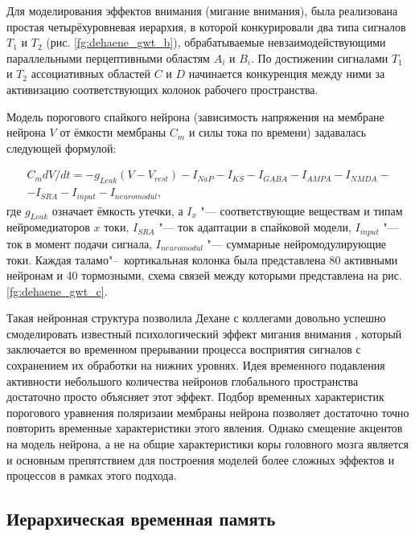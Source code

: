 Для моделирования эффектов внимания (мигание внимания), была реализована простая четырёхуровневая иерархия, в которой конкурировали два типа сигналов $T_1$ и $T_2$ (рис. \ref{fg:dehaene_gwt_b}), обрабатываемые невзаимодействующими параллельными перцептивными областям $A_i$ и $B_i$. По достижении сигналами $T_1$ и $T_2$ ассоциативных областей $C$ и $D$ начинается конкуренция между ними за активизацию соответствующих колонок рабочего пространства.

Модель порогового спайкого нейрона (зависимость напряжения на мембране нейрона $V$ от ёмкости мембраны $C_m$ и силы тока по времени) задавалась следующей формулой:

\begin{equation}
	\begin{split}
		C_mdV/dt=-g_{Leak}(V-V_{rest})-I_{NaP}-I_{KS}-I_{GABA}-I_{AMPA}-I_{NMDA}-\\
		-I_{SRA}-I_{input}-I_{neuromodul},
	\end{split}
\end{equation}
где $g_{Leak}$ означает ёмкость утечки, а $I_x$ "--- соответствующие веществам и типам нейромедиаторов $x$ токи, $I_{SRA}$ "--- ток адаптации в спайковой модели, $I_{input}$ "--- ток в момент подачи сигнала, $I_{neuromodul}$ "--- суммарные нейромодулирующие токи. Каждая таламо"--~кортикальная колонка была представлена 80 активными нейронам и 40 тормозными, схема связей между которыми представлена на рис. \ref{fg:dehaene_gwt_c}.

Такая нейронная структура позволила Дехане с коллегами довольно успешно смоделировать известный психологический эффект мигания внимания \cite{Raymond1992}, который заключается во временном прерывании процесса восприятия сигналов с сохранением их обработки на нижних уровнях. Идея временного подавления активности небольшого количества нейронов глобального пространства достаточно просто объясняет этот эффект. Подбор временных характеристик порогового уравнения поляризаии мембраны нейрона позволяет достаточно точно повторить временные характеристики этого явления. Однако смещение акцентов на модель нейрона, а не на общие характеристики коры головного мозга является и основным препятствием для построения моделей более сложных эффектов и процессов в рамках этого подхода.

\subsection{Иерархическая временная память}

